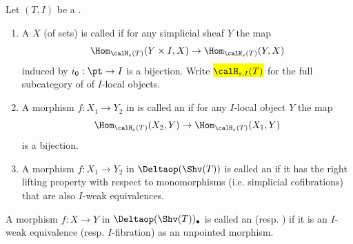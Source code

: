 \begin{definition} \label{definition:I_local_weak_I_weak_equivalence_I_weak_fibration_for_morphisms_of_simplicial_sheaves_on_a_site_with_interval}
    Let $(T,I)$ be a . 
    \begin{enumerate}
        \item A   $X$ (of sets) is called  if for any simplicial sheaf $Y$ the map
        $$\Hom_{\calH_s(T)}(Y \times I, X) \to \Hom_{\calH_s(T)}(Y, X)$$
        induced by $i_0: \pt \to I$ is a bijection. Write \hl{$\calH_{s,I}(T)$} for the full subcategory of  of $I$-local objects. 

        \item A morphism $f: X_1 \to Y_2$ in  is called an  if for any $I$-local object $Y$ the map
        $$\Hom_{\calH_s(T)}(X_2, Y) \to \Hom_{\calH_s(T)}(X_1, Y)$$
        is a bijection.

        \item A morphism $f: X_1 \to Y_2$ in $\Deltaop(\Shv(T))$ is called an  if it has the right lifting property with respect to monomorphisms (i.e. simplicial cofibrations) that are also $I$-weak equivalences.

    \end{enumerate}
    A morphism $f: X \to Y$ in $\Deltaop(\Shv(T))_\bullet$ is called an  (resp. ) if it is an $I$-weak equivalence (resp. $I$-fibration) as an unpointed morphism.
\end{definition}